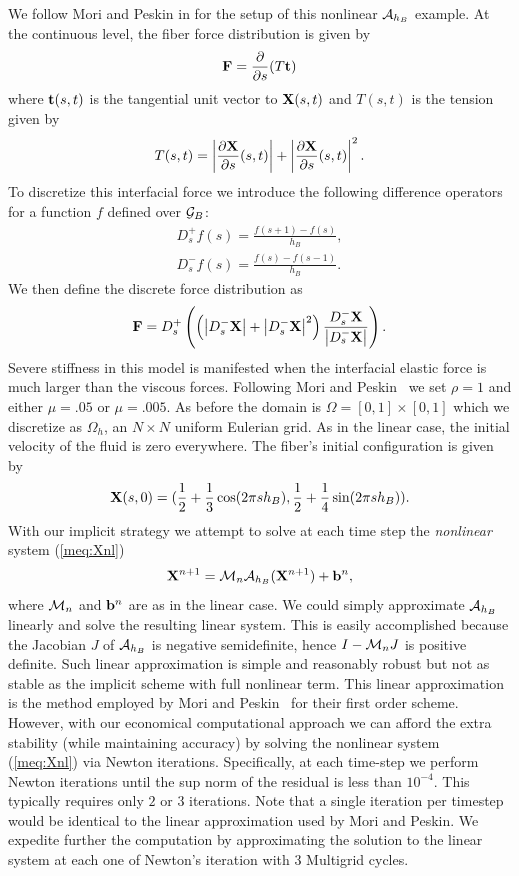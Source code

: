 We follow Mori and Peskin in \cite{MP2008} for the setup of this nonlinear $\mathcal{A}_{h_B}$  example. At the continuous level,  the fiber force distribution is given by
\begin{equation}
\mathbf{F} = \frac{\partial}{\partial s} (T\mathbf{t})
\end{equation}
where $\mathbf{t}(s,t)$ is the tangential unit vector to $\mathbf{X}(s,t)$ and $T(s,t)$ is the tension given by
\begin{equation}
T(s,t) = \left| \frac{\partial\mathbf{X}}{\partial s}(s,t) \right|
 +     \left| \frac{\partial\mathbf{X}}{\partial s}(s,t) \right|^2.
\end{equation}
To discretize this interfacial force we introduce the following difference operators for  a function $f$ defined over $\mathcal{G}_B$:
\begin{eqnarray}
D_s^+f(s) = \frac{f(s+1)-f(s)}{h_B},\\
D_s^-f(s) = \frac{f(s)-f(s-1)}{h_B}.
\end{eqnarray}
We then define the discrete force distribution as
\begin{equation}
\mathbf{F} = D_s^+ \left(\left(
\left| D_s^-\mathbf{X} \right| +
\left| D_s^-\mathbf{X} \right|^2 \right)
\frac{ D_s^-\mathbf{X} }{ \left| D_s^-\mathbf{X} \right| } \right).
\end{equation}
Severe stiffness in this model is manifested when the interfacial elastic force is much larger than the viscous forces. Following
Mori and Peskin~\cite{MP2008} we set $\rho = 1$ and either $\mu = .05$ or $\mu = .005$. As before the domain is $\Omega = [0,1]\times[0,1]$ which we discretize as $\Omega_h$, an $N\times N$ uniform Eulerian grid. As in the linear case, the initial velocity of the fluid is zero everywhere. The fiber's initial configuration is given by
\begin{equation}
\mathbf{X}(s,0) = (\frac{1}{2} + \frac{1}{3}\cos(2\pi sh_B), \frac{1}{2} + \frac{1}{4}\sin(2\pi sh_B)).
\end{equation}
With our implicit strategy we attempt to solve at each time step the {\em nonlinear} system (\ref{meq:Xnl})
$$
\mathbf{X}^{n+1} = \mathcal{M}_n\mathcal{A}_{h_B} (\mathbf{X}^{n+1}) + \mathbf{b}^n,
$$
where $\mathcal{M}_n$ and $\mathbf{b}^n$ are as in the linear case. We could simply approximate $\mathcal{A}_{h_B}$ linearly and solve the resulting linear system. This is easily accomplished because the Jacobian $J$ of $\mathcal{A}_{h_B}$ is negative semidefinite, hence  $I-\mathcal{M}_nJ$ is positive definite. Such linear approximation is simple and reasonably robust
but not as stable as the implicit scheme with full nonlinear term. This linear approximation is the method employed by Mori and Peskin~\cite{MP2008} for their first order scheme. However, with our economical computational approach we can afford the extra stability (while maintaining accuracy) by solving the nonlinear system (\ref{meq:Xnl}) via Newton iterations. Specifically, at each time-step we perform Newton iterations until the sup norm of the residual is less than $10^{-4}$. This typically requires only $2$ or $3$ iterations. Note that a single iteration per timestep would be identical to the linear approximation used by Mori and Peskin. We expedite further the 
computation by approximating the solution to the linear system at each one of Newton's iteration with 3 Multigrid cycles.

